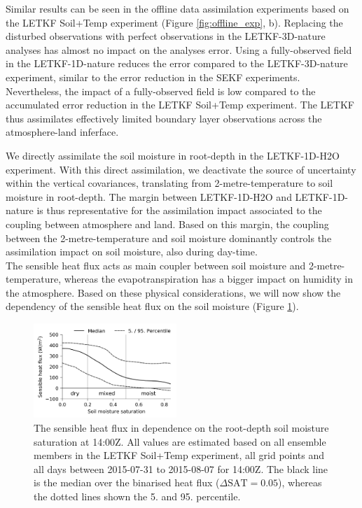 \documentclass[hess, manuscript]{copernicus}
\begin{document}
Similar results can be seen in the offline data assimilation experiments based on the LETKF Soil+Temp experiment (Figure \ref{fig:offline_exp}, b).
Replacing the disturbed observations with perfect observations in the LETKF-3D-nature analyses has almost no impact on the analyses error.
Using a fully-observed field in the LETKF-1D-nature reduces the error compared to the LETKF-3D-nature experiment, similar to the error reduction in the SEKF experiments.
Nevertheless, the impact of a fully-observed field is low compared to the accumulated error reduction in the LETKF Soil+Temp experiment.
The LETKF thus assimilates effectively limited boundary layer observations across the atmosphere-land inferface.

We directly assimilate the soil moisture in root-depth in the LETKF-1D-H2O experiment.
With this direct assimilation, we deactivate the source of uncertainty within the vertical covariances, translating from 2-metre-temperature to soil moisture in root-depth.
The margin between LETKF-1D-H2O and LETKF-1D-nature is thus representative for the assimilation impact associated to the coupling between atmosphere and land.
Based on this margin, the coupling between the 2-metre-temperature and soil moisture dominantly controls the assimilation impact on soil moisture, also during day-time.\\

The sensible heat flux acts as main coupler between soil moisture and 2-metre-temperature, whereas the evapotranspiration has a bigger impact on humidity in the atmosphere.
Based on these physical considerations, we will now show the dependency of the sensible heat flux on the soil moisture (Figure \ref{fig:sensible_smi}).

\begin{figure}[ht]
	\includegraphics[width=0.48\textwidth]{figures/fig_08_sensible_sat.png}
	\caption{
		The sensible heat flux in dependence on the root-depth soil moisture saturation at 14:00Z.
		All values are estimated based on all ensemble members in the LETKF Soil+Temp experiment, all grid points and all days between 2015-07-31 to 2015-08-07 for 14:00Z.
		The black line is the median over the binarised heat flux ($\Delta\text{SAT} = 0.05$), whereas the dotted lines shown the 5. and 95. percentile.
	}
	\label{fig:sensible_smi}
\end{figure}
\end{document}
